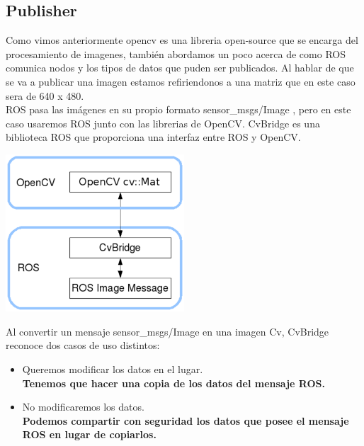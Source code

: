 \subsection{Publisher}
Como vimos anteriormente opencv es una libreria open-source que se encarga del procesamiento
de imagenes, también abordamos un poco acerca de como ROS comunica nodos y los
tipos de datos que puden ser publicados. Al hablar de que se va a publicar una imagen
estamos refiriendonos a una matriz que en este caso sera de 640 x 480.\\
ROS pasa las imágenes en su propio formato sensor\_msgs/Image , pero
en este caso usaremos ROS junto con las librerias de  OpenCV. CvBridge es una
biblioteca ROS que proporciona una interfaz entre ROS y OpenCV.
\begin{center}
	\includegraphics[width=0.5\textwidth]{Contenido/Cuerpo/Capitulo4/Fig1.eps}
	\label{Fig1}
\end{center}
Al convertir un mensaje sensor\_msgs/Image en una imagen Cv, CvBridge
reconoce dos casos de uso distintos:
\begin{itemize}
	\item Queremos modificar los datos en el lugar.\\
	      \textbf{Tenemos que hacer una copia de los datos del mensaje ROS.}
	\item No modificaremos los datos.\\
	      \textbf{Podemos compartir con seguridad los datos que posee el mensaje ROS en lugar de copiarlos.}
\end{itemize}

